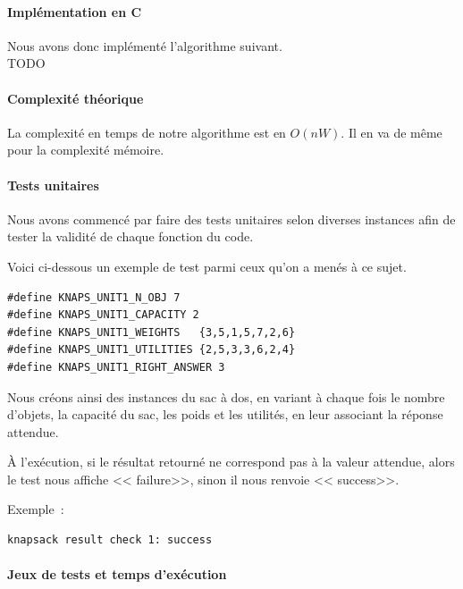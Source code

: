 \documentclass[a4paper, 12pt]{article}
\begin{document}
\paragraph{Implémentation en C}

Nous avons donc implémenté l'algorithme suivant. \\

TODO

  

\paragraph{Complexité théorique}

La complexité en temps de notre algorithme est en $O(nW)$. Il en va de
même pour la complexité mémoire.

\paragraph{Tests unitaires}

Nous avons commencé par faire des tests unitaires selon diverses
instances afin de tester la validité de chaque fonction du code.

Voici ci-dessous un exemple de test parmi ceux qu'on a menés à ce sujet.

\begin{lstlisting}
#define KNAPS_UNIT1_N_OBJ 7
#define KNAPS_UNIT1_CAPACITY 2
#define KNAPS_UNIT1_WEIGHTS   {3,5,1,5,7,2,6}
#define KNAPS_UNIT1_UTILITIES {2,5,3,3,6,2,4}
#define KNAPS_UNIT1_RIGHT_ANSWER 3
\end{lstlisting}

Nous créons ainsi des instances du sac à dos, en variant à chaque fois le nombre d'objets, la capacité du sac, les poids et les utilités, en leur associant la réponse attendue.

À l'exécution, si le résultat retourné ne correspond pas à la valeur attendue, alors le test nous affiche << failure>>, sinon il nous renvoie << success>>.

Exemple~:
\begin{lstlisting}
knapsack result check 1: success
\end{lstlisting}

\paragraph{Jeux de tests et temps d'exécution}
\end{document}
